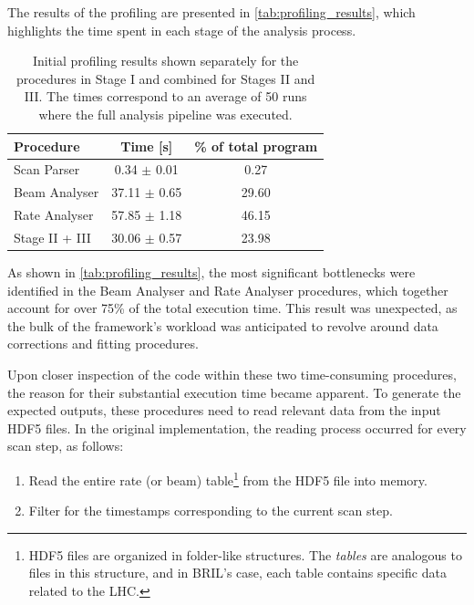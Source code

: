 The results of the profiling are presented in \autoref{tab:profiling_results}, which highlights the time spent in each stage of the analysis process.

\begin{table}[!htb]
	\centering
	\caption[Initial vdMFw profiling results]{Initial profiling results shown separately for the procedures in Stage I and combined for Stages II and III. The times correspond to an average of 50 runs where the full analysis pipeline was executed.}
	\begin{tabular}{|l|c|c|}
		\hline
		\textbf{Procedure} & \textbf{Time [s]} & \textbf{\% of total program} \\
		\hline
		Scan Parser        & 0.34 $\pm$ 0.01   & 0.27                         \\
		Beam Analyser      & 37.11 $\pm$ 0.65  & 29.60                        \\
		Rate Analyser      & 57.85 $\pm$ 1.18  & 46.15                        \\
		Stage II + III     & 30.06 $\pm$ 0.57  & 23.98                        \\
		\hline
	\end{tabular}
	\label{tab:profiling_results}
\end{table}

As shown in \autoref{tab:profiling_results}, the most significant bottlenecks were identified in the Beam Analyser and Rate Analyser procedures, which together account for over 75\% of the total execution time. This result was unexpected, as the bulk of the framework’s workload was anticipated to revolve around data corrections and fitting procedures.

Upon closer inspection of the code within these two time-consuming procedures, the reason for their substantial execution time became apparent. To generate the expected outputs, these procedures need to read relevant data from the input HDF5 files. In the original implementation, the reading process occurred for every scan step, as follows:

\begin{enumerate}
	\item Read the entire rate (or beam) table\footnote{HDF5 files are organized in folder-like structures. The \textit{tables} are analogous to files in this structure, and in BRIL's case, each table contains specific data related to the LHC.} from the HDF5 file into memory.
	\item Filter for the timestamps corresponding to the current scan step.
\end{enumerate}

